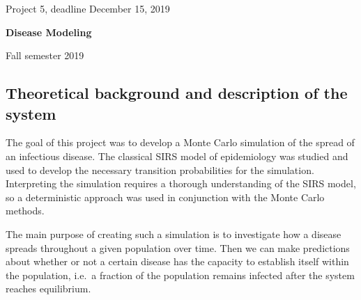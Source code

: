 \documentclass[%
oneside,                 %
final,                   %
10pt]{article}
\begin{document}

\newcommand{\exercisesection}[1]{\subsection*{#1}}






\thispagestyle{empty}

\begin{center}
{\LARGE\bf
\begin{spacing}{1.25}
Project 5, deadline  December 15, 2019
\end{spacing}
}
\end{center}


\begin{center}
{\bf Disease Modeling${}^{}$} \\ [0mm]
\end{center}

\begin{center}
\end{center}
    

\begin{center}
Fall semester 2019
\end{center}

\vspace{1cm}


\subsection{Theoretical background and description of the system}

The goal of this project was to develop a Monte Carlo simulation of
the spread of an infectious disease. The classical SIRS model of
epidemiology was studied and used to develop the necessary transition
probabilities for the simulation. Interpreting the simulation requires
a thorough understanding of the SIRS model, so a deterministic
approach was used in conjunction with the Monte Carlo methods. 

The main purpose of creating such a simulation is to investigate how a
disease spreads throughout a given population over time. Then we can
make predictions about whether or not a certain disease has the
capacity to establish itself within the population, i.e.~a fraction of
the population remains infected after the system reaches
equilibrium. 
\end{document}
